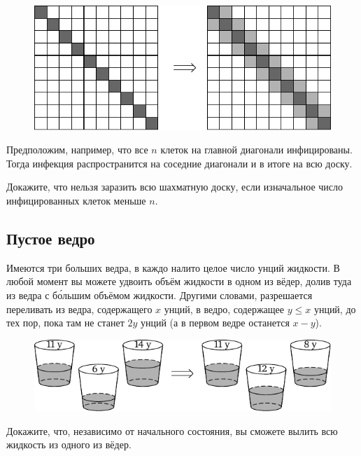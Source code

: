 \documentclass[twoside]{book}
\makeatletter
\newcommand{\rindex}[2][\imki@jobname]{%
  \index[#1]{\detokenize{#2}}%
}
\makeatother
\begin{document}
\begin{figure}[!ht]
\centering
\includegraphics{mp/wink-17}
\end{figure}

Предположим, например, что все $n$ клеток на главной диагонали инфицированы.
Тогда инфекция распространится на соседние диагонали и в итоге на всю доску.

Докажите, что нельзя заразить всю шахматную доску, если изначальное число инфицированных клеток меньше $n$.

\subsection*{Пустое ведро}%
\rindex{Пустое ведро}

Имеются три больших ведра, в каждо налито целое число унций жидкости.
В любой момент вы можете удвоить объём жидкости в одном из вёдер, долив туда \change{}{} из ведра с б\'{о}льшим объёмом жидкости.
Другими словами, разрешается переливать  из ведра, содержащего $x$ унций, в ведро, содержащее 
$y\le x$ унций, до тех пор, пока там не станет $2y$ унций (а в первом ведре останется $x-y$).

\begin{figure}[!ht]
\centering
\includegraphics{mp/wink-18}
\end{figure}

Докажите, что, независимо от начального состояния, вы сможете вылить всю жидкость из одного из вёдер.
\end{document}
